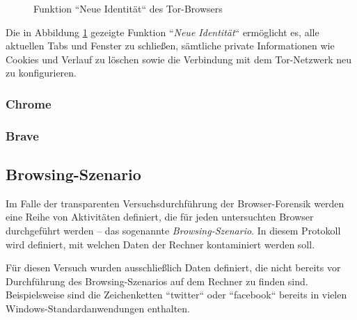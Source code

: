 \begin{figure}[h!]
	\caption{Funktion ``Neue Identität`` des Tor-Browsers}
	\label{img:tor-new-identity}
\end{figure}
Die in Abbildung \ref{img:tor-new-identity} gezeigte Funktion ``\textit{Neue Identität}`` ermöglicht es, alle aktuellen Tabs und Fenster zu schließen, sämtliche private Informationen wie Cookies und Verlauf zu löschen sowie die Verbindung mit dem Tor-Netzwerk neu zu konfigurieren. \cite{Tor.24.05.2023}

\subsubsection*{Chrome}
\label{subsubsection:methodik-vorbereitung-browserauswahl-chrome}

\subsubsection*{Brave}
\label{subsubsection:methodik-vorbereitung-browserauswahl-brave}

\subsection{Browsing-Szenario}
\label{subsection:methodik-vorbereitung-browsing-szenario}
Im Falle der transparenten Versuchsdurchführung der Browser-Forensik werden eine Reihe von Aktivitäten definiert, die für jeden untersuchten Browser durchgeführt werden -- das sogenannte \textit{Browsing-Szenario}.
In diesem Protokoll wird definiert, mit welchen Daten der Rechner kontaminiert werden soll.

Für diesen Versuch wurden ausschließlich Daten definiert, die nicht bereits vor Durchführung des Browsing-Szenarios auf dem Rechner zu finden sind. Beispielsweise sind die Zeichenketten ``twitter`` oder ``facebook`` bereits in vielen Windows-Standardanwendungen enthalten.

